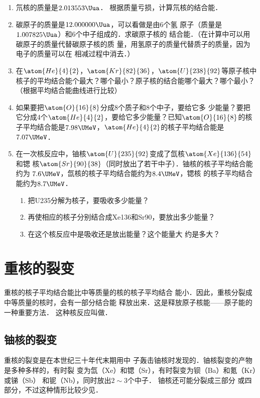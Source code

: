 \begin{enumerate}
    \item 氘核的质量是$2.013553 \Uua$．
    根据质量亏损，计算氘核的结合能．
    \item 碳原子的质量是$12.000000\Uua$，可以看做是由6个氢
原子（质量是$1.007825\Uua$）和6个中子组成的．求碳原子核的
结合能．（在计算中可以用碳原子的质量代替碳原子核的质
量，用氢原子的质量代替质子的质量，因为电子的质量可以在
相减过程中消去．）
\item  在$\atom{He}{4}{2}$，$\atom{Kr}{82}{36}$，$\atom{U}{238}{92}$等原子核中核子的平均结合能个最大？哪个最小？原子核的结合能哪个最大？哪个最小？（根据平均结合能曲线进行比较）
\item 如果要把$\atom{O}{16}{8}$分成8个质子和8个中子，要给它多
少能量？要把它分成$4$个$\atom{He}{4}{2}$，要给它多少能量？已知$\atom{O}{16}{8}$的核
子平均结合能是$7.98\UMeV$，$\atom{He}{4}{2}$的核子平均结合能是
$7.07\UMeV$．
\item 在一次核反应中，铀核$\atom{U}{235}{92}$变成了氙核$\atom{Xe}{136}{54}$和锶
核$\atom{Sr}{90}{38}$（同时放出了若干中子）．铀核的核子平均结合能约为
$7.6 \UMeV$，氙核的核子平均结合能约为$8.4 \UMeV$，锶核
的核子平均结合能约为$8.7 \UMeV$．
\begin{enumerate}
    \item 把U235分解为核子，要吸收多少能量？
    \item 再使相应的核子分别结合成Xe136和Sr90，要放出多少能量？
    \item 在这个核反应中是吸收还是放出能量？这个能量大
约是多大？
\end{enumerate}
\end{enumerate}


\section{重核的裂变}
重核的核子平均结合能比中等质量的核的核子平均结合
能小．因此，重核分裂成中等质量的核时，会有一部分结合能
释放出来．这是释放原子核能——原子能的一种重要方法．
这种核反应叫做．

\subsection{铀核的裂变}

重核的裂变是在本世纪三十年代末期用中
子轰击铀核时发现的．铀核裂变的产物是多种多样的，有时裂
变为氙（Xe）和锶（Sr），有时裂变为钡（Ba）和氪（Kr）或锑（Sb）
和铌（Nb），同时放出$2 \sim 3$个中子．
铀核还可能分裂成三部分
或四部分，不过这种情形比较少见．

